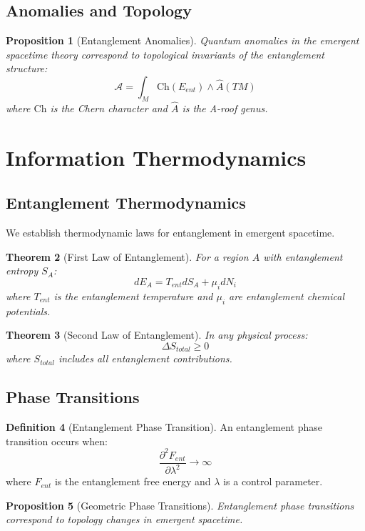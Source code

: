 \documentclass[12pt,a4paper]{article}
\theoremstyle{plain}
\newtheorem{theorem}{Theorem}[section]
\newtheorem{proposition}[theorem]{Proposition}
\theoremstyle{definition}
\newtheorem{definition}[theorem]{Definition}
\theoremstyle{remark}
\begin{document}
\subsection{Anomalies and Topology}

\begin{proposition}[Entanglement Anomalies]
Quantum anomalies in the emergent spacetime theory correspond to topological invariants of the entanglement structure:
\[\mathcal{A} = \int_M \text{Ch}(E_{ent}) \wedge \hat{A}(TM)\]
where $\text{Ch}$ is the Chern character and $\hat{A}$ is the A-roof genus.
\end{proposition}

\section{Information Thermodynamics}

\subsection{Entanglement Thermodynamics}

We establish thermodynamic laws for entanglement in emergent spacetime.

\begin{theorem}[First Law of Entanglement]
For a region $A$ with entanglement entropy $S_A$:
\[dE_A = T_{ent} dS_A + \mu_i dN_i\]
where $T_{ent}$ is the entanglement temperature and $\mu_i$ are entanglement chemical potentials.
\end{theorem}

\begin{theorem}[Second Law of Entanglement]
In any physical process:
\[\Delta S_{total} \geq 0\]
where $S_{total}$ includes all entanglement contributions.
\end{theorem}

\subsection{Phase Transitions}

\begin{definition}[Entanglement Phase Transition]
An entanglement phase transition occurs when:
\[\frac{\partial^2 F_{ent}}{\partial \lambda^2} \to \infty\]
where $F_{ent}$ is the entanglement free energy and $\lambda$ is a control parameter.
\end{definition}

\begin{proposition}[Geometric Phase Transitions]
Entanglement phase transitions correspond to topology changes in emergent spacetime.
\end{proposition}
\end{document}
